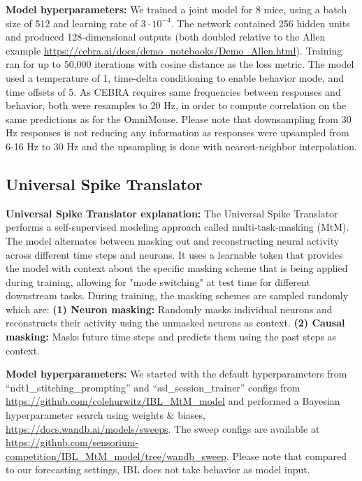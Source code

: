 \documentclass{article} %
\begin{document}
\textbf{Model hyperparameters:} 
We trained a joint model for 8 mice, using a batch size of 512 and learning rate of $3\cdot 10^{-4}$. 
The network contained 256 hidden units and produced 128-dimensional outputs (both doubled relative to the Allen example \url{https://cebra.ai/docs/demo_notebooks/Demo_Allen.html}). Training ran for up to 50,000 iterations with cosine distance as the loss metric. The model used a temperature of 1, time-delta conditioning to enable behavior mode, and time offsets of 5.
As CEBRA requires same frequencies between responses and behavior, both were resamples to 20 Hz, in order to compute correlation on the same predictions as for the OmniMouse. 
Please note that downsampling from 30 Hz responses is not reducing any information as responses were upsampled from 6-16 Hz to 30 Hz and the upsampling is done with nearest-neighbor interpolation.


\subsection{Universal Spike Translator}
\textbf{Universal Spike Translator explanation:} The Universal Spike Translator~\cite{universalspiketranslator} performs a self-supervised modeling approach called multi-task-masking (MtM). The model alternates between masking out and reconstructing neural activity across different time steps and neurons. It uses a learnable token that provides the model with context about the specific masking scheme that is being applied during training, allowing for "mode switching" at test time for different downstream tasks.
During training, the masking schemes are sampled randomly which are: 
\textbf{(1)  Neuron masking:} Randomly masks individual neurons and reconstructs their activity using the unmasked neurons as context.
\textbf{(2) Causal masking:} Masks future time steps and predicts them using the past steps as context.

\textbf{Model hyperparameters:}  
We started with  the default hyperparameters from ``ndt1\_stitching\_prompting'' and ``ssl\_session\_trainer'' configs from \url{https://github.com/colehurwitz/IBL_MtM_model} and performed a Bayesian hyperparameter search using weights \& biases, \url{https://docs.wandb.ai/models/sweeps}. The sweep configs are available at \url{https://github.com/sensorium-competition/IBL_MtM_model/tree/wandb_sweep}. 
Please note that compared to our forecasting settings, IBL does not take behavior as model input.
\end{document}
